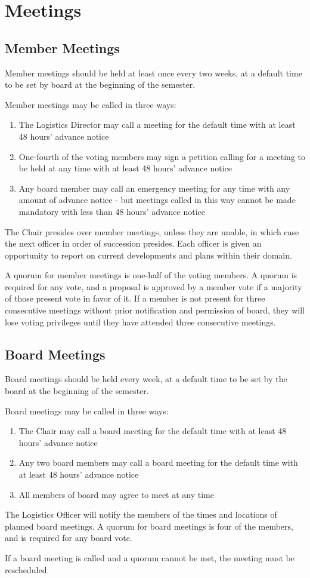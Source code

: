 \section{Meetings}
\label{sec:meetings}



\subsection {Member Meetings}

Member meetings should be held at least once every two weeks, at a default time to be set by board at the beginning of the semester. 

Member meetings may be called in three ways:
\begin{enumerate}
	\item The Logistics Director may call a meeting for the default time with at least 48 hours' advance notice
	\item One-fourth of the voting members may sign a petition calling for a meeting to be held at any time with at least 48 hours' advance notice
	\item Any board member may call an emergency meeting for any time with any amount of advance notice - but meetings called in this way cannot be made mandatory with less than 48 hours' advance notice
\end{enumerate}

The Chair presides over member meetings, unless they are unable, in which case the next officer in order of succession presides. Each officer is given an opportunity to report on current developments and plans within their domain.

A quorum for member meetings is one-half of the voting members. A quorum is required for any vote, and a proposal is approved by a member vote if a majority of those present vote in favor of it.
If a member is not present for three consecutive meetings without prior notification and permission of board, they will lose voting privileges until they have attended three consecutive meetings.



\subsection {Board Meetings}

Board meetings should be held every week, at a default time to be set by the board at the beginning of the semester.

Board meetings may be called in three ways:
\begin{enumerate}
	\item The Chair may call a board meeting for the default time with at least 48 hours' advance notice
	\item Any two board members may call a board meeting for the default time with at least 48 hours' advance notice
	\item All members of board may agree to meet at any time
\end{enumerate}

The Logistics Officer will notify the members of the times and locations of planned board meetings. A quorum for board meetings is four of the members, and is required for any board vote.

If a board meeting is called and a quorum cannot be met, the meeting must be rescheduled
